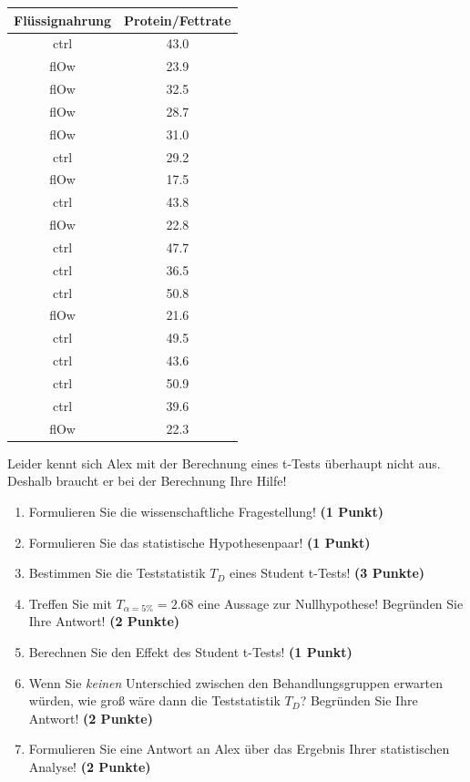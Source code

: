\documentclass[a4paper, 9pt]{scrartcl}\usepackage[]{graphicx}\usepackage[]{xcolor}
\begin{document}
\begin{table}[!h]
\centering
\begin{tabular}{cc}
\toprule
Flüssignahrung & Protein/Fettrate\\
\midrule
ctrl & 43.0\\
flOw & 23.9\\
flOw & 32.5\\
flOw & 28.7\\
flOw & 31.0\\
\addlinespace
ctrl & 29.2\\
flOw & 17.5\\
ctrl & 43.8\\
flOw & 22.8\\
ctrl & 47.7\\
\addlinespace
ctrl & 36.5\\
ctrl & 50.8\\
flOw & 21.6\\
ctrl & 49.5\\
ctrl & 43.6\\
\addlinespace
ctrl & 50.9\\
ctrl & 39.6\\
flOw & 22.3\\
\bottomrule
\end{tabular}
\end{table}



Leider kennt sich Alex mit der Berechnung eines t-Tests überhaupt nicht aus. Deshalb braucht er bei der Berechnung Ihre Hilfe!

\begin{enumerate}
  \item Formulieren Sie die wissenschaftliche Fragestellung! \textbf{(1 Punkt)}
  \item Formulieren Sie das statistische Hypothesenpaar! \textbf{(1 Punkt)}
  \item Bestimmen Sie die Teststatistik $T_{D}$ eines Student t-Tests! \textbf{(3 Punkte)}
\item Treffen Sie mit $T_{\alpha = 5\%} = 2.68$ eine Aussage zur Nullhypothese! Begründen Sie Ihre Antwort! \textbf{(2 Punkte)}
\item Berechnen Sie den Effekt des Student t-Tests! \textbf{(1 Punkt)}
\item Wenn Sie \textit{keinen} Unterschied zwischen den Behandlungsgruppen erwarten würden, wie groß wäre dann die Teststatistik $T_{D}$? Begründen Sie Ihre Antwort! \textbf{(2 Punkte)}
\item Formulieren Sie eine Antwort an Alex über das Ergebnis Ihrer statistischen Analyse! \textbf{(2 Punkte)}
\end{enumerate} 
\clearpage
\end{document}
